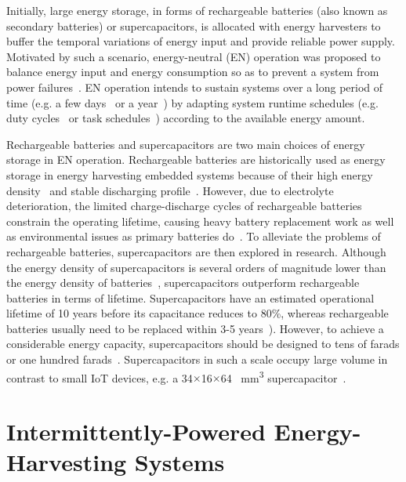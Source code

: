 Initially, large energy storage, in forms of rechargeable batteries (also known as secondary batteries) or supercapacitors, is allocated with energy harvesters to buffer the temporal variations of energy input and provide reliable power supply. 
Motivated by such a scenario, energy-neutral (EN) operation was proposed to balance energy input and energy consumption so as to prevent a system from power failures~\cite{sudevalayam2011energy}. 
EN operation intends to sustain systems over a long period of time (e.g. a few days~\cite{kansal2007power} or a year~\cite{buchli2014dynamic}) by adapting system runtime schedules (e.g. duty cycles~\cite{kansal2007power, buchli2014dynamic, le2012power} or task schedules~\cite{caruso2018dynamic, wagemann2018operating}) according to the available energy amount. 

Rechargeable batteries and supercapacitors are two main choices of energy storage in EN operation. 
Rechargeable batteries are historically used as energy storage in energy harvesting embedded systems because of their high energy density~\cite{akhtar2015energy} and stable discharging profile~\cite{sudevalayam2011energy}. 
However, due to electrolyte deterioration, the limited charge-discharge cycles of rechargeable batteries constrain the operating lifetime, causing heavy battery replacement work as well as environmental issues as primary batteries do~\cite{rakhmatov2002battery}. 
To alleviate the problems of rechargeable batteries, supercapacitors are then explored in research. 
Although the energy density of supercapacitors is several orders of magnitude lower than the energy density of batteries~\cite{merrett2012supercapacitor}, supercapacitors outperform rechargeable batteries in terms of lifetime.
Supercapacitors have an estimated operational lifetime of 10 years before its capacitance reduces to 80\%, whereas rechargeable batteries usually need to be replaced within 3-5 years~\cite{simjee2008efficient}). 
However, to achieve a considerable energy capacity, supercapacitors should be designed to tens of farads or one hundred farads~\cite{jiang2005perpetual, simjee2006everlast}. 
Supercapacitors in such a scale occupy large volume in contrast to small IoT devices, e.g. a 34$\times$16$\times$64 \SI{}{\cubic\milli\meter} supercapacitor~\cite{simjee2006everlast}. 

\section{Intermittently-Powered Energy-Harvesting Systems}

